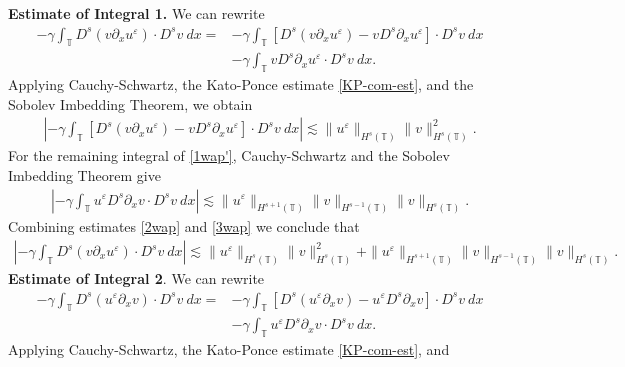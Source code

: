 \documentclass[12pt,reqno]{amsart}
\newcommand{\p}{\partial}
\newcommand{\ci}{\mathbb{T}}
\newcommand{\ee}{\varepsilon}
\theoremstyle{plain}  %
\theoremstyle{definition}
\begin{document}
{\bf Estimate of Integral 1.} We can rewrite
%
%
\begin{equation}
\begin{split}
-\gamma \int_\ci D^s (v \p_x u^\ee ) \cdot D^s v \
dx = & -\gamma \int_\ci \left[ D^s(v \p_x u^\ee) - v D^s
\p_x u^\ee \right] \cdot D^s v \ dx
\\
& -  \gamma \int_\ci v D^s \p_x u^\ee \cdot D^s v \ dx.
\label{1wap'}
\end{split}
\end{equation}
%
%
%
%
%
%
Applying Cauchy-Schwartz, the Kato-Ponce estimate \eqref{KP-com-est}, and the Sobolev 
Imbedding Theorem, we obtain 
%
%
%
%
\begin{equation}
\begin{split}
| -\gamma \int_\ci \left[ D^s(v \p_x u^\ee ) - v D^s
\p_x u^\ee \right] \cdot D^s v \ dx |
\lesssim \|u^\ee \|_{H^s(\ci)} \|v\|_{H^s(\ci)}^2.
\label{2wap}
\end{split}
\end{equation}
%
%
For the remaining integral of \eqref{1wap'}, Cauchy-Schwartz and the Sobolev 
Imbedding Theorem give
%
%
%
\begin{equation}
\begin{split}
| - \gamma \int_\ci u^\ee D^s \p_x v \cdot D^s v \ dx |
\lesssim \|u^\ee \|_{H^{s+1}(\ci)} \|v\|_{H^{s-1}(\ci)}
\|v\|_{H^s(\ci)}.
\label{3wap}
\end{split}
\end{equation}
%
%
Combining estimates \eqref{2wap} and \eqref{3wap} we conclude that
%
%
\begin{equation}
\begin{split}
\left | -\gamma \int_\ci D^s (v \p_x u^\ee ) \cdot D^s v \
dx \right | \lesssim \|u^\ee \|_{H^s(\ci)} \|v\|_{H^s(\ci)}^2 + \|u^\ee 
\|_{H^{s+1}(\ci)} \|v\|_{H^{s-1}(\ci)}
\|v\|_{H^s(\ci)}.
\label{4wap}
\end{split}
\end{equation}
%
%
%
{\bf Estimate of Integral 2}. We can rewrite
%
%
\begin{equation}
\begin{split}
-\gamma \int_\ci D^s (u^\ee \p_x v) \cdot D^s v \
dx
= & -\gamma \int_\ci \left[ D^s(u^\ee \p_x v) - u^\ee D^s
\p_x v \right] \cdot D^s v \ dx
\\
& -  \gamma \int_\ci u^\ee D^s \p_x v \cdot D^s v \ dx.
\label{1wa'}
\end{split}
\end{equation}
%
%
Applying Cauchy-Schwartz, the Kato-Ponce estimate \eqref{KP-com-est}, and 
\end{document}
